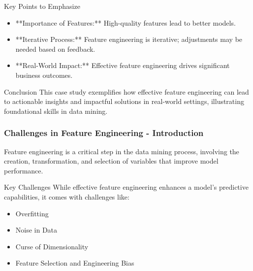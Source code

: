 \documentclass[aspectratio=169]{beamer}
\begin{document}
\begin{frame}{Key Points to Emphasize}
    \begin{itemize}
        \item **Importance of Features:** High-quality features lead to better models.
        \item **Iterative Process:** Feature engineering is iterative; adjustments may be needed based on feedback.
        \item **Real-World Impact:** Effective feature engineering drives significant business outcomes.
    \end{itemize}
\end{frame}

\begin{frame}{Conclusion}
    This case study exemplifies how effective feature engineering can lead to actionable insights and impactful solutions in real-world settings, illustrating foundational skills in data mining.
\end{frame}

\begin{frame}[fragile]
    \frametitle{Challenges in Feature Engineering - Introduction}
    Feature engineering is a critical step in the data mining process, involving the creation, transformation, and selection of variables that improve model performance. 
    \begin{block}{Key Challenges}
        While effective feature engineering enhances a model's predictive capabilities, it comes with challenges like:
        \begin{itemize}
            \item Overfitting
            \item Noise in Data
            \item Curse of Dimensionality
            \item Feature Selection and Engineering Bias
        \end{itemize}
    \end{block}
\end{frame}
\end{document}

